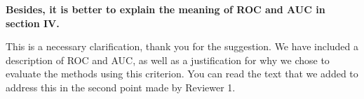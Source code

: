 \documentclass[usenames,dvipsnames]{article}
\newcommand{\todo}[1]{\textcolor{red}{#1}}
\begin{document}
\begin{enumerate}
\begin{item}
\textbf{
Besides, it is better to explain the meaning of ROC and AUC in section IV.}

This is a necessary clarification, thank you for the suggestion. We have included a description of ROC and AUC, as well as a justification for why we chose to evaluate the methods using this criterion. You can read the text that we added to address this in the second point made by Reviewer 1.

\end{item}
\end{enumerate}



\end{document}
